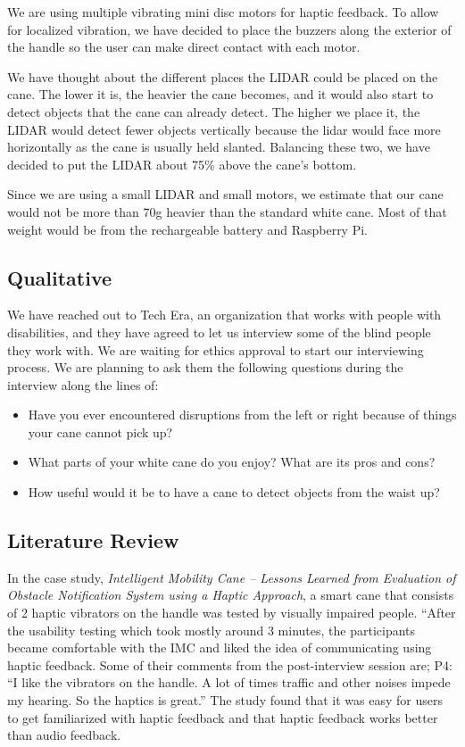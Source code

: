 \documentclass{article}
\begin{document}
We are using multiple vibrating mini disc motors for haptic feedback. To allow for localized vibration, we have decided to place the buzzers along the exterior of the handle so the user can make direct contact with each motor.

We have thought about the different places the LIDAR could be placed on the cane. The lower it is, the heavier the cane becomes, and it would also start to detect objects that the cane can already detect. The higher we place it, the LIDAR would detect fewer objects vertically because the lidar would face more horizontally as the cane is usually held slanted. Balancing these two, we have decided to put the LIDAR about 75\% above the cane’s bottom.

Since we are using a small LIDAR and small motors, we estimate that our cane would not be more than 70g heavier than the standard white cane. Most of that weight would be from the rechargeable battery and Raspberry Pi.

\subsection{Qualitative}

We have reached out to Tech Era, an organization that works with people with disabilities, and they have agreed to let us interview some of the blind people they work with. \cite{techera2020} We are waiting for ethics approval to start our interviewing process. We are planning to ask them the following questions during the interview along the lines of:
\begin{itemize}
  \item Have you ever encountered disruptions from the left or right because of things your cane cannot pick up? 
  \item What parts of your white cane do you enjoy? What are its pros and cons? 
  \item How useful would it be to have a cane to detect objects from the waist up?  
\end{itemize}

\subsection{Literature Review}

In the case study, \textit{Intelligent Mobility Cane – Lessons Learned from Evaluation of Obstacle Notification System using a Haptic Approach}, a smart cane that consists of 2 haptic vibrators on the handle was tested by visually impaired people. \cite{paritiTibdewalOh2020} “After the usability testing which took mostly around 3 minutes, the participants became comfortable with the IMC and liked the idea of communicating using haptic feedback. Some of their comments from the post-interview session are; P4: “I like the vibrators on the handle. A lot of times traffic and other noises impede my hearing. So the haptics is great.” The study found that it was easy for users to get familiarized with haptic feedback and that haptic feedback works better than audio feedback.
\end{document}

